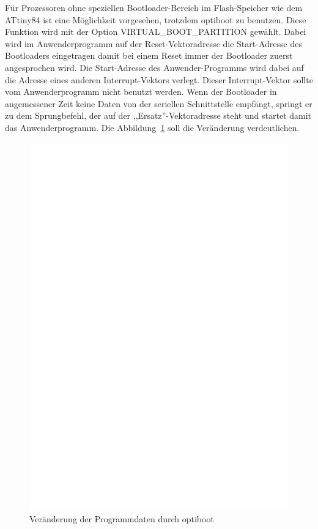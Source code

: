 Für Prozessoren ohne speziellen Bootloader-Bereich im Flash-Speicher wie dem ATtiny84 ist
eine Möglichkeit vorgesehen, trotzdem optiboot zu benutzen. 
Diese Funktion wird mit der Option VIRTUAL\_BOOT\_PARTITION gewählt.
Dabei wird im Anwenderprogramm auf der Reset-Vektoradresse die Start-Adresse des Bootloaders
eingetragen damit bei einem Reset immer der Bootloader zuerst angesprochen wird.
Die Start-Adresse des Anwender-Programms wird dabei auf die Adresse eines anderen
Interrupt-Vektors verlegt. Dieser Interrupt-Vektor sollte vom Anwenderprogramm nicht benutzt werden.
Wenn der Bootloader in angemessener Zeit keine Daten von der seriellen Schnittstelle
empfängt, springt er zu dem Sprungbefehl, der auf der ,,Ersatz''-Vektoradresse steht und
startet damit das Anwenderprogramm.
Die Abbildung~\ref{fig:VectorMove} soll die Veränderung verdeutlichen.

\begin{figure}[H]
\centering
\includegraphics[]{../FIG/VectorMove.eps}
\caption{Veränderung der Programmdaten durch optiboot}
\label{fig:VectorMove}
\end{figure}

